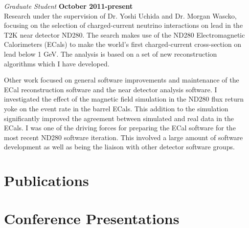 \documentclass[margin,line]{res}
\newenvironment{list2}{
  \begin{list}{$\bullet$}{%
      \setlength{\itemsep}{0in}
      \setlength{\parsep}{0in} \setlength{\parskip}{0in}
      \setlength{\topsep}{0in} \setlength{\partopsep}{0in} 
      \setlength{\leftmargin}{0.2in}}}{\end{list}}
\begin{document}
\begin{resume}
\vspace{-.3cm}
{\em Graduate Student} \hfill {\bf October 2011-present}\\
Research under the supervision of Dr. Yoshi Uchida and Dr. Morgan Wascko, focusing on the selection of charged-current neutrino interactions on lead in the T2K near detector ND280.  The search makes use of the ND280 Electromagnetic Calorimeters (ECals) to make the world's first charged-current cross-section on lead below 1 GeV.  The analysis is based on a set of new reconstruction algorithms which I have developed.

Other work focused on general software improvements and maintenance of the ECal reconstruction software and the near detector analysis software.  I investigated the effect of the magnetic field simulation in the ND280 flux return yoke on the event rate in the barrel ECals.  This addition to the simulation significantly improved the agreement between simulated and real data in the ECals.  I was one of the driving forces for preparing the ECal software for the most recent ND280 software iteration.  This involved a large amount of software development as well as being the liaison with other detector software groups.

 

 
\section{\sc Publications}
\nocite{*}



\section{\sc Conference Presentations}


\end{resume}
\end{document}
